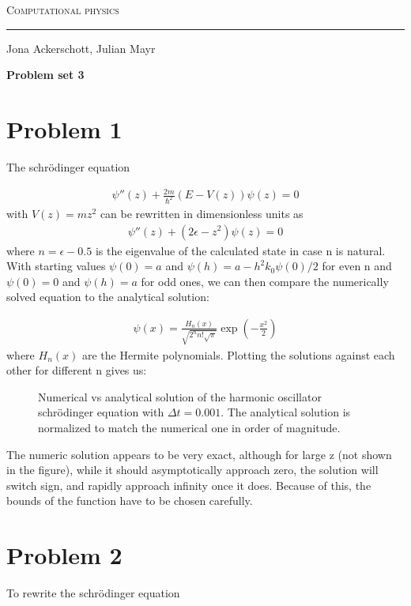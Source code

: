 \documentclass[12pt, a4paper]{article}
\begin{document}
  \centerline{\Huge\scshape Computational physics}
  \vspace*{0.5cm}
  \hrule
  \vspace*{0.5cm}
  \centerline{Jona Ackerschott, Julian Mayr}
  \vspace*{1cm}
  \centerline{\Large\bfseries Problem set 3}
  \vspace*{0.5cm}

  \section*{Problem 1}
  The schrödinger equation
  
  \begin{align} 
  \psi''(z) + \frac{2 m}{\hbar^2} (E - V(z)) \psi(z) = 0
  \end{align}
  \noindent
  with $V(z)=mz^2$ can be rewritten in dimensionless units as
  \begin{align} 
  \psi''(z) + (2\epsilon-z^2) \psi(z) = 0
  \end{align}
  \noindent
  where $n=\epsilon-0.5$ is the eigenvalue of the calculated state in case n is natural. With starting values $\psi(0)=a$ and $\psi(h)=a-h^2k_0\psi(0)/2$ for even n and $\psi(0)=0$ and $\psi(h)=a$ for odd ones, we can then compare the numerically solved equation to the analytical solution:
  
  \begin{align}
  \psi(x)=\frac{H_n(x)}{\sqrt{2^nn!\sqrt{\pi}}}\exp\left(-\frac{x^2}{2}\right)
  \end{align}
  \noindent
  where $H_n(x)$ are the Hermite polynomials. Plotting the solutions against each other for different n gives us:\\
    
  \begin{figure}
  	\scalebox{0.7}{
  		}
  	\caption{Numerical vs analytical solution of the harmonic oscillator schrödinger equation with $\Delta t=0.001$. The analytical solution is normalized to match the numerical one in order of magnitude.}
  	\label{fig1}
  \end{figure}
  \newpage
  
  
  The numeric solution appears to be very exact, although for large z (not shown in the figure), while it should asymptotically approach zero, the solution will switch sign, and rapidly approach infinity once it does. Because of this, the bounds of the function have to be chosen carefully.

  \section*{Problem 2}
  To rewrite the schrödinger equation
\end{document}
